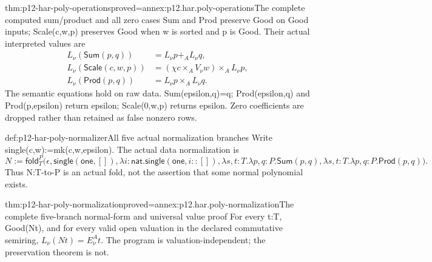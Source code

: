 \begin{hblemma}{thm:p12-har-poly-operations}{proved=annex:p12.har.poly-operations}{The complete computed sum/product and all zero cases}
Sum and Prod preserve Good on Good inputs; Scale(c,w,p) preserves
Good when w is sorted and p is Good. Their actual interpreted values are
\[
\begin{aligned}
 L_\nu(\mathsf{Sum}(p,q))&=L_\nu p+_A L_\nu q,\\
 L_\nu(\mathsf{Scale}(c,w,p))&=(\chi c\times_A V_\nu w)\times_A L_\nu p,\\
 L_\nu(\mathsf{Prod}(p,q))&=L_\nu p\times_A L_\nu q.
\end{aligned}
\]
The semantic equations hold on raw data. Sum(epsilon,q)=q;
Prod(epsilon,q) and Prod(p,epsilon) return epsilon; Scale(0,w,p)
returns epsilon. Zero coefficients are dropped rather than retained
as false nonzero rows.
\end{hblemma}

\begin{hbdefinition}{def:p12-har-poly-normalizer}{All five actual normalization branches}
Write single(c,w):=mk(c,w,epsilon). The actual data normalization is
\[
 N:=\mathsf{fold}_T^P\bigl(
 \epsilon,\mathsf{single}(\mathsf{one},[]),
 \lambda i:\mathsf{nat}.\mathsf{single}(\mathsf{one},i::[]),
 \lambda s,t:T.\lambda p,q:P.\mathsf{Sum}(p,q),
 \lambda s,t:T.\lambda p,q:P.\mathsf{Prod}(p,q)\bigr).
\]
Thus N:T-to-P is an actual fold, not the assertion that some normal
polynomial exists.
\end{hbdefinition}

\begin{hbtheorem}{thm:p12-har-poly-normalization}{proved=annex:p12.har.poly-normalization}{The complete five-branch normal-form and universal value proof}
For every t:T, Good(Nt), and for every valid open valuation in the
declared commutative semiring,
\(L_\nu(Nt)=E_\nu^A t\).
The program is valuation-independent; the preservation theorem is not.
\end{hbtheorem}



